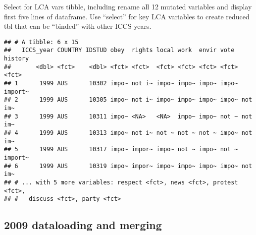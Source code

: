 \documentclass[]{article}
\newenvironment{Shaded}{\begin{snugshade}}{\end{snugshade}}
\newcommand{\DataTypeTok}[1]{\textcolor[rgb]{0.13,0.29,0.53}{#1}}
\newcommand{\KeywordTok}[1]{\textcolor[rgb]{0.13,0.29,0.53}{\textbf{#1}}}
\newcommand{\NormalTok}[1]{#1}
\newcommand{\OperatorTok}[1]{\textcolor[rgb]{0.81,0.36,0.00}{\textbf{#1}}}
\newcommand{\StringTok}[1]{\textcolor[rgb]{0.31,0.60,0.02}{#1}}
\begin{document}
Select for LCA vars tibble, including rename all 12 mutated variables
and display first five lines of dataframe. Use ``select'' for key LCA
variables to create reduced tbl that can be ``binded'' with other ICCS
years.

\begin{Shaded}
\end{Shaded}

\begin{verbatim}
## # A tibble: 6 x 15
##   ICCS_year COUNTRY IDSTUD obey  rights local work  envir vote  history
##       <dbl> <fct>    <dbl> <fct> <fct>  <fct> <fct> <fct> <fct> <fct>  
## 1      1999 AUS      10302 impo~ not i~ impo~ impo~ impo~ impo~ import~
## 2      1999 AUS      10305 impo~ not i~ impo~ impo~ impo~ impo~ not im~
## 3      1999 AUS      10311 impo~ <NA>   <NA>  impo~ impo~ not ~ not im~
## 4      1999 AUS      10313 impo~ not i~ not ~ not ~ not ~ impo~ not im~
## 5      1999 AUS      10317 impo~ impor~ impo~ not ~ impo~ not ~ import~
## 6      1999 AUS      10319 impo~ impor~ impo~ impo~ impo~ impo~ not im~
## # ... with 5 more variables: respect <fct>, news <fct>, protest <fct>,
## #   discuss <fct>, party <fct>
\end{verbatim}

\hypertarget{dataloading-and-merging}{%
\subsection{2009 dataloading and
merging}\label{dataloading-and-merging}}
\end{document}
